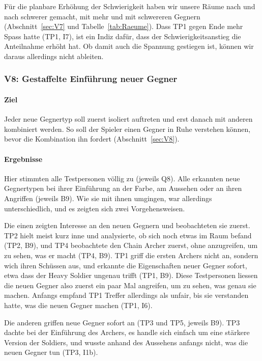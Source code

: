 \documentclass[../Main.tex]{subfiles}
\begin{document}
Für die planbare Erhöhung der Schwierigkeit haben wir unsere Räume nach und nach schwerer gemacht, mit mehr und mit schwereren Gegnern (Abschnitt~\ref{sec:V7} und Tabelle~\ref{tab:Raeume}). Dass TP1 gegen Ende mehr Spass hatte (TP1, I7), ist ein Indiz dafür, dass der Schwierigkeitsanstieg die Anteilnahme erhöht hat. Ob damit auch die Spannung gestiegen ist, können wir daraus allerdings nicht ableiten.

\subsubsection{V8: Gestaffelte Einführung neuer Gegner}

\paragraph{Ziel}
Jeder neue Gegnertyp soll zuerst isoliert auftreten und erst danach mit anderen kombiniert werden. So soll der Spieler einen Gegner in Ruhe verstehen können, bevor die Kombination ihn fordert (Abschnitt~\ref{sec:V8}).

\paragraph{Ergebnisse}
Hier stimmten alle Testpersonen völlig zu (jeweils Q8). Alle erkannten neue Gegnertypen bei ihrer Einführung an der Farbe, am Aussehen oder an ihren Angriffen (jeweils B9). Wie sie mit ihnen umgingen, war allerdings unterschiedlich, und es zeigten sich zwei Vorgehensweisen.

Die einen zeigten Interesse an den neuen Gegnern und beobachteten sie zuerst. TP2 hielt meist kurz inne und analysierte, ob sich noch etwas im Raum befand (TP2, B9), und TP4 beobachtete den Chain Archer zuerst, ohne anzugreifen, um zu sehen, was er macht (TP4, B9). TP1 griff die ersten Archers nicht an, sondern wich ihren Schüssen aus, und erkannte die Eigenschaften neuer Gegner sofort, etwa dass der Heavy Soldier ungenau trifft (TP1, B9). Diese Testpersonen liessen die neuen Gegner also zuerst ein paar Mal angreifen, um zu sehen, was genau sie machen. Anfangs empfand TP1 Treffer allerdings als unfair, bis sie verstanden hatte, was die neuen Gegner machen (TP1, I6).

Die anderen griffen neue Gegner sofort an (TP3 und TP5, jeweils B9). TP3 dachte bei der Einführung des Archers, es handle sich einfach um eine stärkere Version der Soldiers, und wusste anhand des Aussehens anfangs nicht, was die neuen Gegner tun (TP3, I1b).
\end{document}
